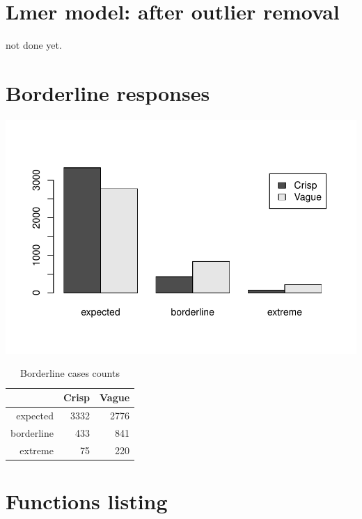 \documentclass[a4paper,12pt,twoside]{article}\usepackage[]{graphicx}\usepackage[]{color}
\makeatletter
\def\maxwidth{ %
  \ifdim\Gin@nat@width>\linewidth
    \linewidth
  \else
    \Gin@nat@width
  \fi
}
\newenvironment{knitrout}{}{} %
\makeatother
\begin{document}
\clearpage
\section{Lmer model: after outlier removal}
not done yet.
\clearpage
\section{Borderline responses}

\begin{knitrout}\scriptsize
{}\color{fgcolor}

{\centering \includegraphics[width=\maxwidth]{figure/graphics-barplotBorderline-1} 

}



\end{knitrout}

\begin{table}[htbp]
\centering
\begingroup\small
\begin{tabular}{rrr}
  \hline
 & Crisp & Vague \\ 
  \hline
expected & 3332 & 2776 \\ 
  borderline & 433 & 841 \\ 
  extreme &  75 & 220 \\ 
   \hline
\end{tabular}
\endgroup
\caption{Borderline cases counts} 
\end{table}


\clearpage
\appendix
\section{Functions listing}
\clearpage
\end{document}
